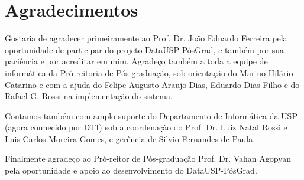 \section{Agradecimentos}

Gostaria de agradecer primeiramente ao Prof. Dr. João Eduardo Ferreira pela oportunidade de participar do projeto DataUSP-PósGrad, e também por sua paciência e por acreditar em mim. Agradeço também a toda a equipe de informática da Pró-reitoria de Pós-graduação, sob orientação do Marino Hilário Catarino e com a ajuda do Felipe Augusto Araujo Dias, Eduardo Dias Filho e do Rafael G. Rossi na implementação do sistema.
\par Contamos também com amplo suporte do Departamento de Informática da USP (agora conhecido por DTI) sob a coordenação do Prof. Dr. Luiz Natal Rossi e Luis Carlos Moreira Gomes, e gerência de Silvio Fernandes de Paula.
\par Finalmente agradeço ao Pró-reitor de Pós-graduação Prof. Dr. Vahan Agopyan pela oportunidade e apoio ao desenvolvimento do DataUSP-PósGrad. 
